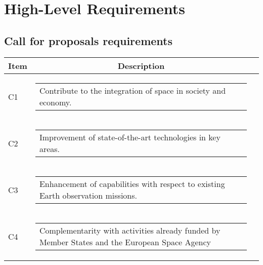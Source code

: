\section{High-Level Requirements}
\subsection{Call for proposals requirements}
\begin{longtable}[H]{l c c}
	\toprule[2pt]
	\textbf{Item} &  \textbf{Description}                                                                                                                                               \\ \midrule
	C1 & \begin{tabular}[c]{@{}l@{}}\begin{minipage}[t]{\linewidth}
Contribute to the integration of space in society and economy. \vspace{0.3cm}
	\end{minipage} \end{tabular}                                                                                                                                            \\ \hline
	C2 & \begin{tabular}[c]{@{}l@{}}\begin{minipage}[t]{\linewidth}
			Improvement of state-of-the-art technologies in key areas. \vspace{0.3cm}
	\end{minipage} \end{tabular}                                                                                                                                            \\  \midrule
	C3 & \begin{tabular}[c]{@{}l@{}}\begin{minipage}[t]{\linewidth}
Enhancement of capabilities with respect to existing Earth observation missions. \vspace{0.3cm}
	\end{minipage} \end{tabular}                                                                                                                                          \\  \midrule
	C4 & \begin{tabular}[c]{@{}l@{}}\begin{minipage}[t]{\linewidth}
Complementarity with activities already funded by Member States and the European Space Agency \vspace{0.3cm}

\end{minipage}
\end{tabular}
\end{longtable}

